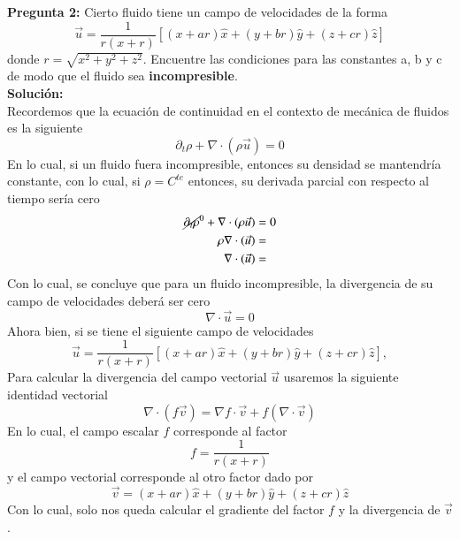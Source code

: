 \documentclass[11pt,letterpaper]{article}
\begin{document}
\textbf{Pregunta 2:} Cierto fluido tiene un campo de velocidades de la forma
\begin{equation}
    \vec{u} = \frac{1}{r(x+r)} [(x+ar)\hat{x} + (y+br)\hat{y} + (z+cr)\hat{z}]
\end{equation}
donde $r=\sqrt{x^2+y^2+z^2}$. Encuentre las condiciones para las constantes a, b y c de modo que el fluido sea \textbf{incompresible}. \\
\textbf{Solución:} \\
Recordemos que la ecuación de continuidad en el contexto de mecánica de fluidos es la siguiente
\begin{equation}
  \partial_t\rho + \nabla \cdot (\rho \vec{u}) = 0
\end{equation}
En lo cual, si un fluido fuera incompresible, entonces su densidad se mantendría constante, con lo cual, si $\rho=C^{te}$ entonces, su derivada parcial con respecto al tiempo sería cero
\begin{align*}
  \cancel{\partial_t\rho}^0 + \nabla \cdot (\rho \vec{u})  & = 0 \\
  \rho \nabla \cdot (\vec{u}) & = \\
  \nabla \cdot (\vec{u}) & = 
\end{align*}
Con lo cual, se concluye que para un fluido incompresible, la divergencia de su campo de velocidades deberá ser cero
\begin{equation}
  \nabla \cdot \vec{u} = 0
\end{equation}
Ahora bien, si se tiene el siguiente campo de velocidades
\begin{equation}
    \vec{u} = \frac{1}{r(x+r)} [(x+ar)\hat{x} + (y+br)\hat{y} + (z+cr)\hat{z}],
\end{equation}
Para calcular la divergencia del campo vectorial $\vec{u}$ usaremos la siguiente identidad vectorial
\begin{equation}
  \nabla \cdot (f\vec{v}) = \nabla f \cdot \vec{v} + f(\nabla \cdot \vec{v})
\end{equation}
En lo cual, el campo escalar $f$ corresponde al factor
\begin{equation}
  f=\frac{1}{r(x+r)}
\end{equation}
y el campo vectorial corresponde al otro factor dado por
\begin{equation}
  \vec{v}=(x+ar)\hat{x} + (y+br)\hat{y} + (z+cr)\hat{z}
\end{equation}
Con lo cual, solo nos queda calcular el gradiente del factor $f$ y la divergencia de $\vec{v}$.
\end{document}
